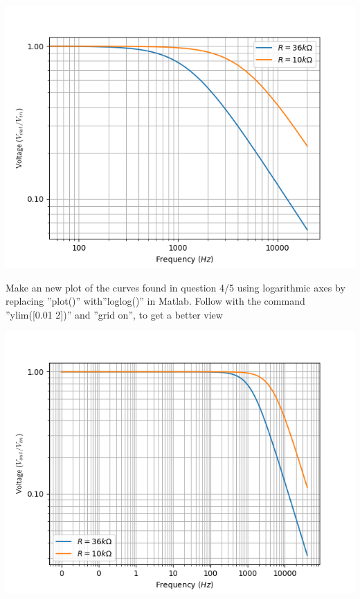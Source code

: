 \documentclass{../../myassignment}
\begin{document}
	\begin{answer}
		\includegraphics{scalarlowpassfilter.png}
	\end{answer}

	\newpage

	\begin{problem}
		Make an new plot of the curves found in question 4/5 using logarithmic axes by replacing ”plot()” with”loglog()” in Matlab.  Follow with the command ”ylim([0.01 2])” and ”grid on”, to get a better view
	\end{problem}

	\begin{answer}
		\includegraphics{logarithmiclowpassfilter.png}
	\end{answer}
\end{document}
